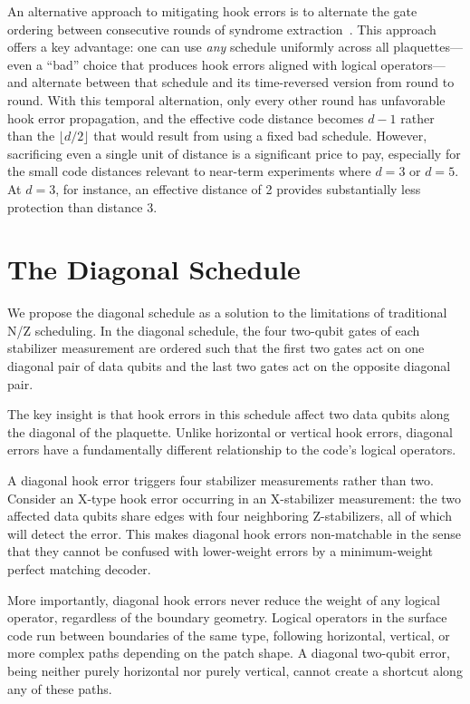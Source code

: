 \documentclass[twocolumn,
aps,
prx,
showpacs,
amsmath,
amssymb,
floatfix,
longbibliography,
superscriptaddress,
eprint]
{revtex4-1}
\begin{document}
An alternative approach to mitigating hook errors is to alternate the gate ordering between consecutive rounds of syndrome extraction~\cite{bluvstein2025architectural, gidney2024alternating}.
This approach offers a key advantage: one can use \emph{any} schedule uniformly across all plaquettes---even a ``bad'' choice that produces hook errors aligned with logical operators---and alternate between that schedule and its time-reversed version from round to round.
With this temporal alternation, only every other round has unfavorable hook error propagation, and the effective code distance becomes $d-1$ rather than the $\lfloor d/2 \rfloor$ that would result from using a fixed bad schedule.
However, sacrificing even a single unit of distance is a significant price to pay, especially for the small code distances relevant to near-term experiments where $d=3$ or $d=5$.
At $d=3$, for instance, an effective distance of 2 provides substantially less protection than distance 3.

\section{The Diagonal Schedule}
\label{sec:diagonal}

We propose the diagonal schedule as a solution to the limitations of traditional N/Z scheduling.
In the diagonal schedule, the four two-qubit gates of each stabilizer measurement are ordered such that the first two gates act on one diagonal pair of data qubits and the last two gates act on the opposite diagonal pair.

The key insight is that hook errors in this schedule affect two data qubits along the diagonal of the plaquette.
Unlike horizontal or vertical hook errors, diagonal errors have a fundamentally different relationship to the code's logical operators.

A diagonal hook error triggers four stabilizer measurements rather than two.
Consider an X-type hook error occurring in an X-stabilizer measurement: the two affected data qubits share edges with four neighboring Z-stabilizers, all of which will detect the error.
This makes diagonal hook errors non-matchable in the sense that they cannot be confused with lower-weight errors by a minimum-weight perfect matching decoder.

More importantly, diagonal hook errors never reduce the weight of any logical operator, regardless of the boundary geometry.
Logical operators in the surface code run between boundaries of the same type, following horizontal, vertical, or more complex paths depending on the patch shape.
A diagonal two-qubit error, being neither purely horizontal nor purely vertical, cannot create a shortcut along any of these paths.
\end{document}

